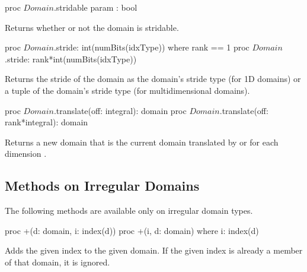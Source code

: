 \begin{protohead}
proc $Domain$.stridable param : bool
\end{protohead}
\begin{protobody}
Returns whether or not the domain is stridable.
\end{protobody}

\begin{protohead}
proc $Domain$.stride: int(numBits(idxType)) where rank == 1
proc $Domain$.stride: rank*int(numBits(idxType))
\end{protohead}
\begin{protobody}
Returns the stride of the domain as the domain's stride type (for 1D
domains) or a tuple of the domain's stride type (for multidimensional
domains).
\end{protobody}

\begin{protohead}
proc $Domain$.translate(off: integral): domain
proc $Domain$.translate(off: rank*integral): domain
\end{protohead}
\begin{protobody}
Returns a new domain that is the current domain translated
by  or  for each dimension .
\end{protobody}


\subsection{Methods on Irregular Domains}

The following methods are available only on irregular domain types.

\begin{protohead}
proc +(d: domain, i: index(d))
proc +(i, d: domain) where i: index(d)
\end{protohead}
\begin{protobody}
Adds the given index to the given domain.  If the given index is already a
member of that domain, it is ignored.
\end{protobody}

